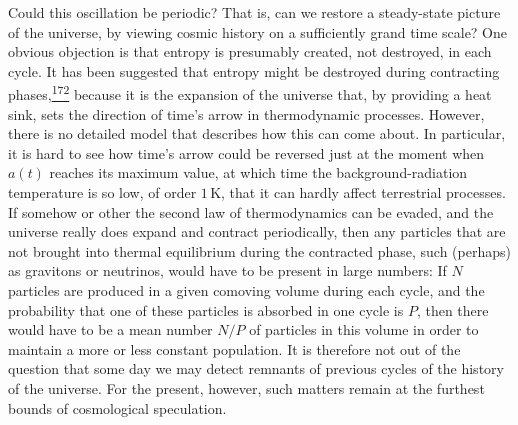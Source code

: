Could this oscillation be periodic? That is, can we restore a steady-state
picture of the universe, by viewing cosmic history on a sufficiently grand time
scale? One obvious objection is that entropy is presumably created, not
destroyed, in each cycle. It has been suggested that entropy might be destroyed
during contracting phases,\hyperref[ch15-ref-172]{\textsuperscript{172}}
because it is the expansion of the universe that, by providing a heat sink,
sets the direction of time's arrow in thermodynamic processes. However, there
is no detailed model that describes how this can come about. In particular, it
is hard to see how time's arrow could be reversed just at the moment when
\(a(t)\) reaches its maximum value, at which time the background-radiation
temperature is so low, of order \(1\,\mathrm K\), that it can hardly affect
terrestrial processes. If somehow or other the second law of thermodynamics
can be evaded, and the universe really does expand and contract periodically,
then any particles that are not brought into thermal equilibrium during the
contracted phase, such (perhaps) as gravitons or neutrinos, would have to be
present in large numbers: If \(N\) particles are produced in a given comoving
volume during each cycle, and the probability that one of these particles is
absorbed in one cycle is \(P\), then there would have to be a mean number
\(N/P\) of particles in this volume in order to maintain a more or less
constant population. It is therefore not out of the question that some day we
may detect remnants of previous cycles of the history of the universe. For the
present, however, such matters remain at the furthest bounds of cosmological
speculation.
